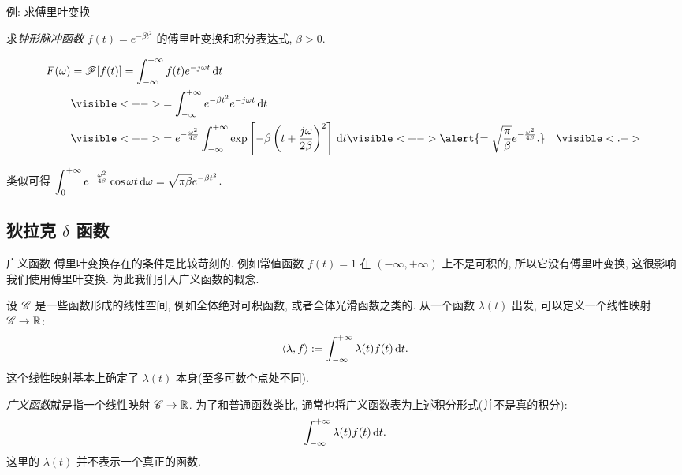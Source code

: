 \begin{frame}{例: 求傅里叶变换}
	\onslide<+->
	\begin{example}
		求\emph{钟形脉冲函数} $f(t)=e^{-\beta t^2}$ 的傅里叶变换和积分表达式, $\beta>0$.
	\end{example}

	\onslide<+->
	\begin{solution}
		\vspace{-\baselineskip}
		\begin{align*}
			F(\omega)&=\msf[f(t)]=\int_{-\infty}^{+\infty}f(t)e^{-j\omega t}\diff t\\
			&\visible<+->{=\int_{-\infty}^{+\infty}e^{-\beta t^2}e^{-j\omega t}\diff t}\\
			&\visible<+->{=e^{-\frac{\omega^2}{4\beta}}\int_{-\infty}^{+\infty}\exp\left[-\beta\left(t+\frac{j\omega}{2\beta}\right)^2\right]\diff t}
			\visible<+->{\alert{=\sqrt{\frac\pi\beta}e^{-\frac{\omega^2}{4\beta}}.}}&\visible<.->{}
		\end{align*}
	\end{solution}

	\onslide<+->
	类似可得
	$\displaystyle\int_0^{+\infty}e^{-\frac{\omega^2}{4\beta}}\cos\omega t\,\mathrm{d}\omega=\sqrt{\pi\beta}e^{-\beta t^2}$.
\end{frame}


\subsection{狄拉克 \texorpdfstring{$\delta$}{δ} 函数}

\begin{frame}{广义函数}
	\onslide<+->
	傅里叶变换存在的条件是比较苛刻的.
	\onslide<+->
	例如常值函数 $f(t)=1$ 在 $(-\infty,+\infty)$ 上不是可积的, 所以它没有傅里叶变换, 这很影响我们使用傅里叶变换.
	\onslide<+->
	为此我们引入广义函数的概念.

	\onslide<+->
	设 $\mathscr{C}$ 是一些函数形成的线性空间, 例如全体绝对可积函数, 或者全体光滑函数之类的. 
	\onslide<+->
	从一个函数 $\lambda(t)$ 出发, 可以定义一个线性映射 $\mathscr{C}\to {\mathbb{R}}$:
	\[\langle{\lambda,f}\rangle:=\int_{-\infty}^{+\infty}\lambda(t)f(t)\,\mathrm{d} t.\]
	\onslide<+->
	这个线性映射基本上确定了 $\lambda(t)$ 本身(至多可数个点处不同).

	\onslide<+->
	\emph{广义函数}就是指一个线性映射 $\mathscr{C}\to {\mathbb{R}}$.
	\onslide<+->
	为了和普通函数类比, 通常也将广义函数表为上述积分形式(并不是真的积分):
	\[\int_{-\infty}^{+\infty}\lambda(t)f(t)\,\mathrm{d} t.\]
	这里的 $\lambda(t)$ 并不表示一个真正的函数.
\end{frame}


